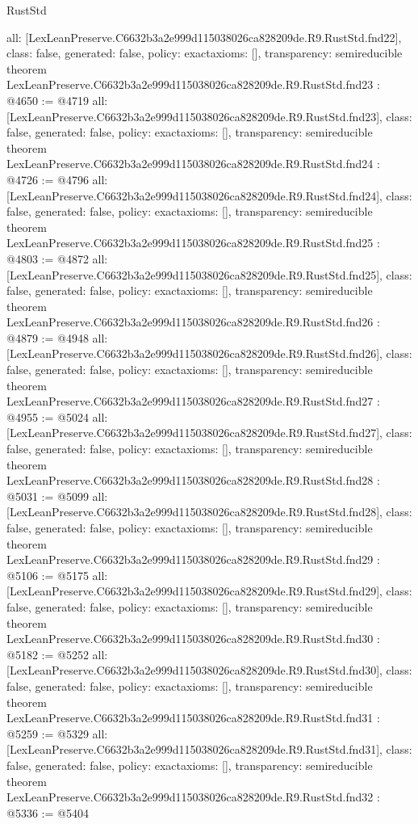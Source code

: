 \begin{lexlean}{RustStd}
\begin{coremodule}
{  all: [LexLeanPreserve.C6632b3a2e999d115038026ca828209de.R9.RustStd.fnd22],
  class: false,
  generated: false,
  policy: exact{axioms: []},
  transparency: semireducible
}
theorem LexLeanPreserve.C6632b3a2e999d115038026ca828209de.R9.RustStd.fnd23 : @4650 := @4719 {
  all: [LexLeanPreserve.C6632b3a2e999d115038026ca828209de.R9.RustStd.fnd23],
  class: false,
  generated: false,
  policy: exact{axioms: []},
  transparency: semireducible
}
theorem LexLeanPreserve.C6632b3a2e999d115038026ca828209de.R9.RustStd.fnd24 : @4726 := @4796 {
  all: [LexLeanPreserve.C6632b3a2e999d115038026ca828209de.R9.RustStd.fnd24],
  class: false,
  generated: false,
  policy: exact{axioms: []},
  transparency: semireducible
}
theorem LexLeanPreserve.C6632b3a2e999d115038026ca828209de.R9.RustStd.fnd25 : @4803 := @4872 {
  all: [LexLeanPreserve.C6632b3a2e999d115038026ca828209de.R9.RustStd.fnd25],
  class: false,
  generated: false,
  policy: exact{axioms: []},
  transparency: semireducible
}
theorem LexLeanPreserve.C6632b3a2e999d115038026ca828209de.R9.RustStd.fnd26 : @4879 := @4948 {
  all: [LexLeanPreserve.C6632b3a2e999d115038026ca828209de.R9.RustStd.fnd26],
  class: false,
  generated: false,
  policy: exact{axioms: []},
  transparency: semireducible
}
theorem LexLeanPreserve.C6632b3a2e999d115038026ca828209de.R9.RustStd.fnd27 : @4955 := @5024 {
  all: [LexLeanPreserve.C6632b3a2e999d115038026ca828209de.R9.RustStd.fnd27],
  class: false,
  generated: false,
  policy: exact{axioms: []},
  transparency: semireducible
}
theorem LexLeanPreserve.C6632b3a2e999d115038026ca828209de.R9.RustStd.fnd28 : @5031 := @5099 {
  all: [LexLeanPreserve.C6632b3a2e999d115038026ca828209de.R9.RustStd.fnd28],
  class: false,
  generated: false,
  policy: exact{axioms: []},
  transparency: semireducible
}
theorem LexLeanPreserve.C6632b3a2e999d115038026ca828209de.R9.RustStd.fnd29 : @5106 := @5175 {
  all: [LexLeanPreserve.C6632b3a2e999d115038026ca828209de.R9.RustStd.fnd29],
  class: false,
  generated: false,
  policy: exact{axioms: []},
  transparency: semireducible
}
theorem LexLeanPreserve.C6632b3a2e999d115038026ca828209de.R9.RustStd.fnd30 : @5182 := @5252 {
  all: [LexLeanPreserve.C6632b3a2e999d115038026ca828209de.R9.RustStd.fnd30],
  class: false,
  generated: false,
  policy: exact{axioms: []},
  transparency: semireducible
}
theorem LexLeanPreserve.C6632b3a2e999d115038026ca828209de.R9.RustStd.fnd31 : @5259 := @5329 {
  all: [LexLeanPreserve.C6632b3a2e999d115038026ca828209de.R9.RustStd.fnd31],
  class: false,
  generated: false,
  policy: exact{axioms: []},
  transparency: semireducible
}
theorem LexLeanPreserve.C6632b3a2e999d115038026ca828209de.R9.RustStd.fnd32 : @5336 := @5404 {
}
\end{coremodule}
\end{lexlean}
